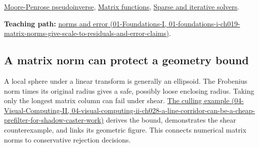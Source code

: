 \hyperref[appendix-541306fdbc1b]{Moore-Penrose pseudoinverse}, \hyperref[appendix-0f4bc2bf2b1f]{Matrix functions}, \hyperref[appendix-67c87a3d9e94]{Sparse and iterative solvers}.

\textbf{Teaching path:} \href{../01-Foundations-I/main.pdf\#nameddest=01-foundations-i-ch019-matrix-norms-give-scale-to-residuals-and-error-claims}{norms and error (01-Foundations-I, 01-foundations-i-ch019-matrix-norms-give-scale-to-residuals-and-error-claims)}.

\subsection{A matrix norm can protect a geometry bound}\label{appendix-f8657bac66e5-a-matrix-norm-can-protect-a-geometry-bound}

A local sphere under a linear transform is generally an ellipsoid. The Frobenius norm times its original radius gives a safe, possibly loose enclosing radius. Taking only the longest matrix column can fail under shear. \href{../04-Visual-Computing-II/main.pdf\#nameddest=04-visual-computing-ii-ch028-a-line-corridor-can-be-a-cheap-prefilter-for-shadow-caster-work}{The culling example (04-Visual-Computing-II, 04-visual-computing-ii-ch028-a-line-corridor-can-be-a-cheap-prefilter-for-shadow-caster-work)} derives the bound, demonstrates the shear counterexample, and links its geometric figure. This connects numerical matrix norms to conservative rejection decisions.
